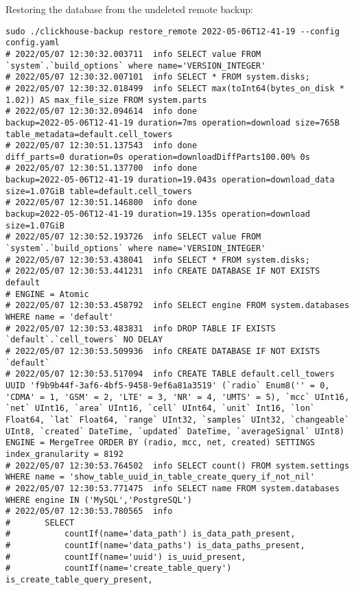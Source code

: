 Restoring the database from the undeleted remote backup:
\begin{verbatim}
sudo ./clickhouse-backup restore_remote 2022-05-06T12-41-19 --config config.yaml
# 2022/05/07 12:30:32.003711  info SELECT value FROM `system`.`build_options` where name='VERSION_INTEGER'
# 2022/05/07 12:30:32.007101  info SELECT * FROM system.disks;
# 2022/05/07 12:30:32.018499  info SELECT max(toInt64(bytes_on_disk * 1.02)) AS max_file_size FROM system.parts
# 2022/05/07 12:30:32.094614  info done                      backup=2022-05-06T12-41-19 duration=7ms operation=download size=765B table_metadata=default.cell_towers
# 2022/05/07 12:30:51.137543  info done                      diff_parts=0 duration=0s operation=downloadDiffParts100.00% 0s
# 2022/05/07 12:30:51.137700  info done                      backup=2022-05-06T12-41-19 duration=19.043s operation=download_data size=1.07GiB table=default.cell_towers
# 2022/05/07 12:30:51.146800  info done                      backup=2022-05-06T12-41-19 duration=19.135s operation=download size=1.07GiB
# 2022/05/07 12:30:52.193726  info SELECT value FROM `system`.`build_options` where name='VERSION_INTEGER'
# 2022/05/07 12:30:53.438041  info SELECT * FROM system.disks;
# 2022/05/07 12:30:53.441231  info CREATE DATABASE IF NOT EXISTS default
# ENGINE = Atomic
# 2022/05/07 12:30:53.458792  info SELECT engine FROM system.databases WHERE name = 'default'
# 2022/05/07 12:30:53.483831  info DROP TABLE IF EXISTS `default`.`cell_towers` NO DELAY
# 2022/05/07 12:30:53.509936  info CREATE DATABASE IF NOT EXISTS `default`
# 2022/05/07 12:30:53.517094  info CREATE TABLE default.cell_towers UUID 'f9b9b44f-3af6-4bf5-9458-9ef6a81a3519' (`radio` Enum8('' = 0, 'CDMA' = 1, 'GSM' = 2, 'LTE' = 3, 'NR' = 4, 'UMTS' = 5), `mcc` UInt16, `net` UInt16, `area` UInt16, `cell` UInt64, `unit` Int16, `lon` Float64, `lat` Float64, `range` UInt32, `samples` UInt32, `changeable` UInt8, `created` DateTime, `updated` DateTime, `averageSignal` UInt8) ENGINE = MergeTree ORDER BY (radio, mcc, net, created) SETTINGS index_granularity = 8192
# 2022/05/07 12:30:53.764502  info SELECT count() FROM system.settings WHERE name = 'show_table_uuid_in_table_create_query_if_not_nil'
# 2022/05/07 12:30:53.771475  info SELECT name FROM system.databases WHERE engine IN ('MySQL','PostgreSQL')
# 2022/05/07 12:30:53.780565  info
# 		SELECT
# 			countIf(name='data_path') is_data_path_present,
# 			countIf(name='data_paths') is_data_paths_present,
# 			countIf(name='uuid') is_uuid_present,
# 			countIf(name='create_table_query') is_create_table_query_present,

\end{verbatim}
